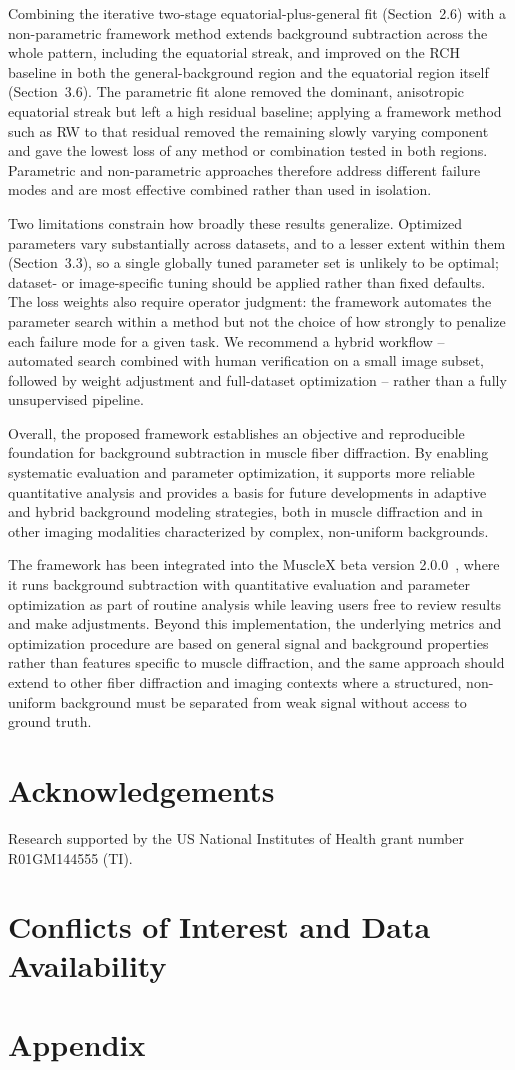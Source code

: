 \documentclass[iucr]{iucrjournals}
\begin{document}
Combining the iterative two-stage equatorial-plus-general fit (Section~2.6) with a non-parametric framework method extends background subtraction across the whole pattern, including the equatorial streak, and improved on the RCH baseline in both the general-background region and the equatorial region itself (Section~3.6). The parametric fit alone removed the dominant, anisotropic equatorial streak but left a high residual baseline; applying a framework method such as RW to that residual removed the remaining slowly varying component and gave the lowest loss of any method or combination tested in both regions. Parametric and non-parametric approaches therefore address different failure modes and are most effective combined rather than used in isolation.

Two limitations constrain how broadly these results generalize. Optimized parameters vary substantially across datasets, and to a lesser extent within them (Section~3.3), so a single globally tuned parameter set is unlikely to be optimal; dataset- or image-specific tuning should be applied rather than fixed defaults. The loss weights also require operator judgment: the framework automates the parameter search within a method but not the choice of how strongly to penalize each failure mode for a given task. We recommend a hybrid workflow -- automated search combined with human verification on a small image subset, followed by weight adjustment and full-dataset optimization -- rather than a fully unsupervised pipeline.

Overall, the proposed framework establishes an objective and reproducible foundation for background subtraction in muscle fiber diffraction. By enabling systematic evaluation and parameter optimization, it supports more reliable quantitative analysis and provides a basis for future developments in adaptive and hybrid background modeling strategies, both in muscle diffraction and in other imaging modalities characterized by complex, non-uniform backgrounds.

The framework has been integrated into the MuscleX beta version 2.0.0~\cite{lee2019musclex}, where it runs background subtraction with quantitative evaluation and parameter optimization as part of routine analysis while leaving users free to review results and make adjustments. Beyond this implementation, the underlying metrics and optimization procedure are based on general signal and background properties rather than features specific to muscle diffraction, and the same approach should extend to other fiber diffraction and imaging contexts where a structured, non-uniform background must be separated from weak signal without access to ground truth.




\section*{Acknowledgements}
Research supported by the US National Institutes of Health grant number R01GM144555 (TI).

\section*{Conflicts of Interest and Data Availability} 





\section*{Appendix}
\appendix

\end{document}
